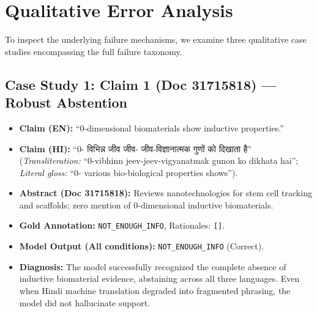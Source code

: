 \documentclass[10pt,twocolumn]{article}
\begin{document}
\section{Qualitative Error Analysis}
\label{sec:error_analysis}

To inspect the underlying failure mechanisms, we examine three qualitative case studies encompassing the full failure taxonomy.

\subsection{Case Study 1: Claim 1 (Doc 31715818) — Robust Abstention}
\begin{itemize}
    \item \textbf{Claim (EN):} ``0-dimensional biomaterials show inductive properties.''
    \item \textbf{Claim (HI):} ``0- विभिन्न जीव जीव- जीव-विज्ञानात्मक गुणों को दिखाता है'' (\textit{Transliteration:} ``0-vibhinn jeev-jeev-vigyanatmak gunon ko dikhata hai''; \textit{Literal gloss:} ``0- various bio-biological properties shows'').
    \item \textbf{Abstract (Doc 31715818):} Reviews nanotechnologies for stem cell tracking and scaffolds; zero mention of 0-dimensional inductive biomaterials.
    \item \textbf{Gold Annotation:} \texttt{NOT\_ENOUGH\_INFO}, Rationales: \texttt{[]}.
    \item \textbf{Model Output (All conditions):} \texttt{NOT\_ENOUGH\_INFO} (Correct).
    \item \textbf{Diagnosis:} The model successfully recognized the complete absence of inductive biomaterial evidence, abstaining across all three languages. Even when Hindi machine translation degraded into fragmented phrasing, the model did not hallucinate support.
\end{itemize}
\end{document}
